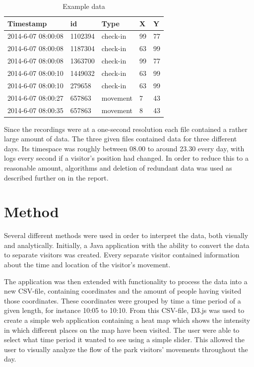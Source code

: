 \documentclass[journal]{vgtc}                %
\begin{document}
\begin{table}[h!]
\centering
\caption{Example data}
\label{dataexample}
\begin{tabular}{|l|l|l|l|l|}
\hline
\textbf{Timestamp} & \textbf{id} & \textbf{Type} & \textbf{X} & \textbf{Y} \\ \hline
2014-6-07 08:00:08 & 1102394     & check-in      & 99         & 77         \\ \hline
2014-6-07 08:00:08 & 1187304     & check-in      & 63         & 99         \\ \hline
2014-6-07 08:00:08 & 1363700     & check-in      & 99         & 77         \\ \hline
2014-6-07 08:00:10 & 1449032     & check-in      & 63         & 99         \\ \hline
2014-6-07 08:00:10 & 279658      & check-in      & 63         & 99         \\ \hline
2014-6-07 08:00:27 & 657863      & movement      & 7          & 43         \\ \hline
2014-6-07 08:00:35 & 657863      & movement      & 8          & 43         \\ \hline
\end{tabular}
\end{table}
Since the recordings were at a one-second resolution each file contained a rather large amount of data. The three given files contained data for three different days. Its timespace was roughly between 08.00 to around 23.30 every day, with logs every second if a visitor’s position had changed. In order to reduce this to a reasonable amount, algorithms and deletion of redundant data was used as described further on in the report.


\section{Method}
Several different methods were used in order to interpret the data, both visually and analytically. Initially, a Java application with the ability to convert the data to separate visitors was created. Every separate visitor contained information about the time and location of the visitor’s movement.

The application was then extended with functionality to process the data into a new CSV-file, containing coordinates and the amount of people having visited those coordinates. These coordinates were grouped by time a time period of a given length, for instance 10:05 to 10:10. From this CSV-file, D3.js was used to create a simple web application containing a heat map which shows the intensity in which different places on the map have been visited. The user were able to select what time period it wanted to see using a simple slider. This allowed the user to visually analyze the flow of the park visitors’ movements throughout the day.
\end{document}
